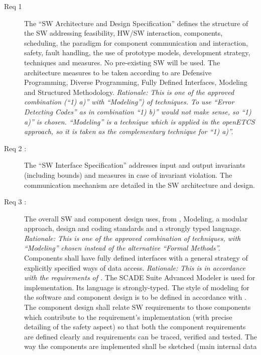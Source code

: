 \documentclass{template/openetcs_article}
\begin{document}
\begin{description}
\item[Req 1 {\cite[7.3.4.2 to 7.4.3.17]{EN50128:2011}}] The ``SW
  Architecture and Design Specification'' defines the structure of the
  SW addressing feasibility, HW/SW interaction, components,
  scheduling, the paradigm for component communication and
  interaction, safety, fault handling, the use of prototype models,
  development strategy, techniques and measures. No pre-existing SW
  will be used. The architecture measures to be taken according to
  \cite[A.3]{EN50128:2011} are Defensive Programming, Diverse
  Programming, Fully Defined Interfaces, Modeling and Structured
  Methodology. \emph{Rationale: This is one of the approved
  combination (``1) a)'' with ``Modeling'') of techniques. To use
  ``Error Detecting Codes'' as in combination ``1) b)'' would not make
  sense, so ``1) a)'' is chosen. ``Modeling'' is a technique which is
  applied in the openETCS approach, so it is taken as the
  complementary technique for ``1) a)''.}
\item[Req 2 {\cite[7.3.4.18 to 7.4.3.20]{EN50128:2011}}:] The ``SW
  Interface Specification'' addresses input and output invariants
  (including bounds) and measures in case of invariant violation. The
  communication mechanism are detailed in the SW architecture and design.
\item[Req 3 {\cite[7.3.4.21 to 7.4.3.24, 7.4.4.1 to
    7.4.4.6]{EN50128:2011}}:] The overall SW and component design
  uses, from \cite[A.4]{EN50128:2011}, Modeling, a modular approach,
  design and coding standards and a strongly typed
  language. \emph{Rationale: This is one of the approved combination
    of techniques, with ``Modeling'' chosen instead of the alternative
    ``Formal Methods''.}  Components shall have fully defined
  interfaces with a general strategy of explicitly specified ways of
  data access. \emph{Rationale: This is in accordance with the
    requirements of \cite[A.20]{EN50128:2011}.}  The SCADE Suite
  Advanced Modeler is used for implementation. Its language is
  strongly-typed.  The style of modeling for the software and
  component design is to be defined in accordance with
  \cite[A.17]{EN50128:2011}. The component design shall relate SW
  requirements to those components which contribute to the
  requirement's implementation (with precise detailing of the safety
  aspect) so that both the component requirements are defined clearly
  and requirements can be traced, verified and tested. The way the
  components are implemented shall be sketched (main internal data

\end{description}
\end{document}
